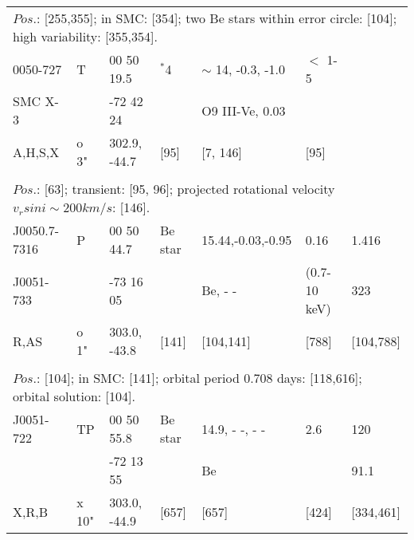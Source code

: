 \documentclass{aa}
\begin{document}
\begin{table*}[h]
\begin{tabular}{p{2.5cm}p{1cm}p{1.8cm}p{2.3cm}p{3.3cm}p{2.0cm}p{2.2cm}}
\\
\multicolumn{7}{p{17.5cm}}{$Pos$.: [255,355]; in SMC: [354]; two Be stars within error circle: [104]; high variability: 
[355,354].}\\

\noalign{\smallskip}
\hline
\noalign{\smallskip}

0050-727     &   T      & 00 50 19.5           & $^*$4         & $\sim$ 14, -0.3, -1.0       &    $<$ 1-5          &                      \\
SMC X-3     &            & -72 42 24             &                    & O9 III-Ve, 0.03                &                            &                     \\
A,H,S,X       &  o 3"  & 302.9, -44.7         &  [95]           &    [7, 146]                          &        [95]          &                      \\
\\
\multicolumn{7}{p{17.5cm}}{
$Pos$.: [63]; transient: [95, 96]; projected rotational velocity $v_rsin i \sim  200 km/s$: [146].}\\

\noalign{\smallskip}
\hline
\noalign{\smallskip}
J0050.7-7316  &  P        &  00 50 44.7    & Be star &    15.44,-0.03,-0.95 &  0.16                    & 1.416  \\
J0051-733       &             &  -73 16 05      &                 &   Be, - -                     &  (0.7-10 keV)      &  323   \\
R,AS                 &   o 1"  & 303.0, -43.8   &    [141]    &   [104,141]               &        [788]             &  [104,788]  \\
  
\\
\multicolumn{7}{p{17.5cm}}{
$Pos$.: [104]; in SMC: [141]; orbital period 0.708 days: [118,616]; orbital solution: [104].}\\

\noalign{\smallskip}
\hline
\noalign{\smallskip}
J0051-722     &     TP     &   00 50 55.8      & Be star   & 14.9, - -, - -  &       2.6          &        120     \\
                        &               &  -72 13 55         &                   &  Be               &                         &          91.1  \\
X,R,B             &   x 10"   & 303.0, -44.9      &   [657]       &    [657]         &     [424]          &     [334,461]     \\
  

\end{tabular}
\end{table*}
\end{document}
